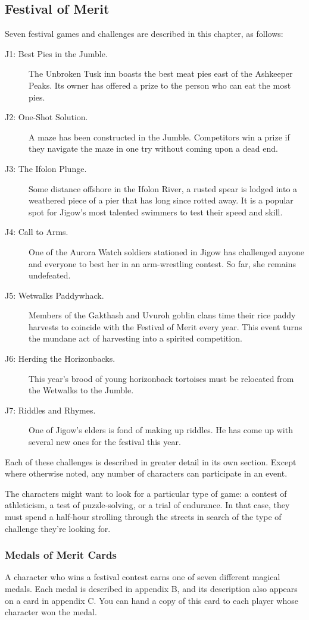 \documentclass[10pt,a4paper,twoside,fancy,bg=print,twocolumn,openany,nodeprecatedcode]{dndbook}
\begin{document}
\subsection{Festival of Merit}
Seven festival games and challenges are described in this chapter, as follows:


\begin{description}
\item[J1: Best Pies in the Jumble.]
The Unbroken Tusk inn boasts the best meat pies east of the Ashkeeper Peaks. Its owner has offered a prize to the person who can eat the most pies.
\item[J2: One-Shot Solution.]
A maze has been constructed in the Jumble. Competitors win a prize if they navigate the maze in one try without coming upon a dead end.
\item[J3: The Ifolon Plunge.]
Some distance offshore in the Ifolon River, a rusted spear is lodged into a weathered piece of a pier that has long since rotted away. It is a popular spot for Jigow's most talented swimmers to test their speed and skill.
\item[J4: Call to Arms.]
One of the Aurora Watch soldiers stationed in Jigow has challenged anyone and everyone to best her in an arm-wrestling contest. So far, she remains undefeated.
\item[J5: Wetwalks Paddywhack.]
Members of the Gakthash and Uvuroh goblin clans time their rice paddy harvests to coincide with the Festival of Merit every year. This event turns the mundane act of harvesting into a spirited competition.
\item[J6: Herding the Horizonbacks.]
This year's brood of young horizonback tortoises must be relocated from the Wetwalks to the Jumble.
\item[J7: Riddles and Rhymes.]
One of Jigow's elders is fond of making up riddles. He has come up with several new ones for the festival this year.
\end{description}

Each of these challenges is described in greater detail in its own section. Except where otherwise noted, any number of characters can participate in an event.

The characters might want to look for a particular type of game: a contest of athleticism, a test of puzzle-solving, or a trial of endurance. In that case, they must spend a half-hour strolling through the streets in search of the type of challenge they're looking for.

\subsubsection{Medals of Merit Cards}
A character who wins a festival contest earns one of seven different magical medals. Each medal is described in appendix B, and its description also appears on a card in appendix C. You can hand a copy of this card to each player whose character won the medal.
\end{document}
